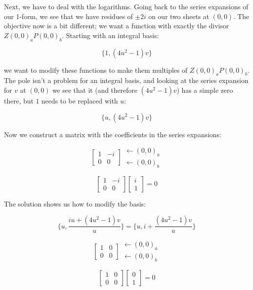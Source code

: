 Next, we have to deal with the logarithms.  Going back to the
series expansions of our 1-form, we see that we have residues
of $\pm 2i$ on our two sheets at $(0,0)$.  The objective
now is a bit different; we want a function with exactly
the divisor $Z(0,0)_a P(0,0)_b$.  Starting with an integral basis:

$$\{1, (4u^2-1)v\}$$

we want to modify these functions to make them multiples
of $Z(0,0)_a P(0,0)_b$.  The pole isn't a problem for
an integral basis, and looking at the series expansion
for $v$ at $(0,0)$ we see that it (and therefore $(4u^2-1)v$)
has a simple zero there, but $1$ needs to be replaced with $u$:

$$\{u, (4u^2-1)v\}$$

Now we construct a matrix with the coefficients in the series expansions:

$$\left[ \begin{array}{cc} 1 & -i \\ 0 & 0 \end{array} \right] \begin{array}{ll} \leftarrow (0,0)_a \\ \leftarrow (0,0)_b \end{array} $$

$$\left[ \begin{array}{cc} 1 & -i \\ 0 & 0 \end{array} \right] \left[ \begin{array}{c} i \\ 1 \end{array} \right] = 0$$

The solution shows us how to modify the basis:

$$\{u, \frac{iu + (4u^2-1)v}{u}\} = \{u, i + \frac{(4u^2-1)v}{u}\}$$

$$\left[ \begin{array}{cc} 1 & 0 \\ 0 & 0 \end{array} \right] \begin{array}{ll} \leftarrow (0,0)_a \\ \leftarrow (0,0)_b \end{array} $$

$$\left[ \begin{array}{cc} 1 & 0 \\ 0 & 0 \end{array} \right] \left[ \begin{array}{c} 0 \\ 1 \end{array} \right] = 0$$

